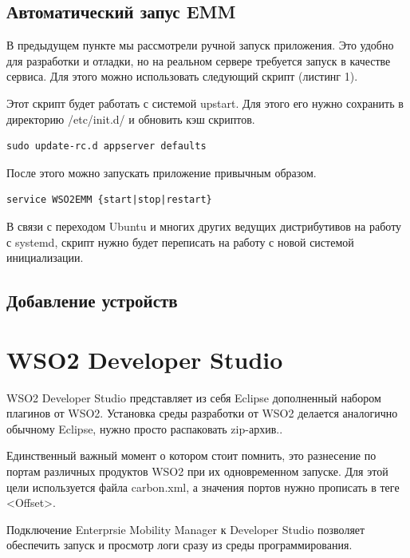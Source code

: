 \documentclass[a4paper, 12pt]{article}		%
\begin{document}
\subsection{Автоматический запус EMM}

В предыдущем пункте мы рассмотрели ручной запуск приложения. Это удобно для разработки и отладки, но на реальном сервере требуется запуск в качестве сервиса. Для этого можно использовать следующий скрипт (листинг 1).

Этот скрипт будет работать с системой upstart. Для этого его нужно сохранить в директорию /etc/init.d/ и обновить кэш скриптов.

\begin{Verbatim}[frame=single]
sudo update-rc.d appserver defaults
\end{Verbatim}

После этого можно запускать приложение привычным образом.

\begin{Verbatim}[frame=single]
service WSO2EMM {start|stop|restart}
\end{Verbatim}

В связи с переходом Ubuntu и многих других ведущих дистрибутивов на работу с systemd, скрипт нужно будет переписать на работу с новой системой инициализации.



\subsection{Добавление устройств}

\section{WSO2 Developer Studio}

WSO2 Developer Studio представляет из себя Eclipse дополненный набором плагинов от WSO2. Установка среды разработки от WSO2 делается аналогично обычному Eclipse, нужно просто распаковать zip-архив..

Единственный важный момент о котором стоит помнить, это разнесение по портам различных продуктов WSO2 при их одновременном запуске. Для этой цели используется файла carbon.xml, а значения портов нужно прописать в теге <Offset>.

Подключение Enterprsie Mobility Manager к Developer Studio позволяет обеспечить запуск и просмотр логи сразу из среды программирования.



\end{document}
